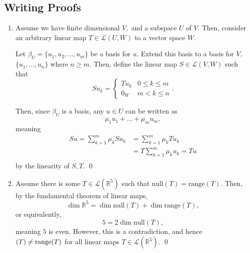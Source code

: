 \documentclass[12pt]{article}
\begin{document}
\subsection{Writing Proofs}
\begin{enumerate}
  \item Assume we have finite dimensional $V,$ and a subspace $U$ of
    $V.$ Then, consider an arbitrary linear map $T \in \mathcal L(U,
    W)$ to a vector space $W.$

    Let $\beta_U = \{u_1, u_2, \ldots,u_m\}$ be a basis for $u$.
    Extend this basis to a basis for $V,$ $\{u_1, \ldots, u_n\}$
    where $n \geq m.$ Then, define the linear map $S \in \mathcal
    L(V, W)$ such that
    $$
    Su_k =
    \begin{cases}
      Tu_k & 0 \leq k \leq m \\
      0_W & m < k \leq n
    \end{cases}.
    $$

    Then, since $\beta_U$ is a basis, any $u \in U$ can be written as
    $$
    \mu_1u_1 + \ldots + \mu_m u_m,
    $$
    meaning
    \begin{align*}
      S u = \sum_{k = 1}^{m}\mu_k S u_k &= \sum_{k = 1}^{m} \mu_k Tu_k \\
      &= T\sum_{k = 1}^{m} \mu_ku_k = Tu \\
    \end{align*}
    by the linearity of $S, T.$ \qed

  \item Assume there is some $T \in \mathcal L(\mathbb R^5)$ such
    that $\text{null}(T) = \text{range}(T).$ Then, by the fundamental
    theorem of linear maps,
    $$
    \dim \mathbb R^5 = \dim \text{null}(T) + \dim \text{range}(T),
    $$
    or equivalently,
    $$
    5 = 2\dim \text{null}(T),
    $$
    meaning $5$ is even. However, this is a contradiction, and hence
    $\null(T) \neq \text{range}(T)$ for all linear maps $T \in
    \mathcal L(\mathbb R^5).$ \qed


\end{enumerate}
\end{document}
